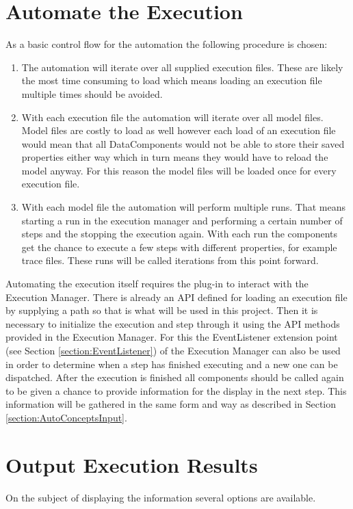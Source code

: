 \section{Automate the Execution}
\label{section:AutoConceptsExecution}
As a basic control flow for the automation the following procedure is chosen:
\begin{enumerate}
 \item The automation will iterate over all supplied execution files. These are likely the most time consuming
to load which means loading an execution file multiple times should be avoided.
 \item With each execution file the automation will iterate over all model files. Model files are costly to load
as well however each load of an execution file would mean that all DataComponents would not be able to store their
saved properties either way which in turn means they would have to reload the model anyway. For this reason the model
files will be loaded once for every execution file.
 \item With each model file the automation will perform multiple runs. That means starting a run in the execution manager
and performing a certain number of steps and the stopping the execution again. With each run the components get the chance
to execute a few steps with different properties, for example trace files. These runs will be called iterations from this
point forward.
\end{enumerate}

Automating the execution itself requires the plug-in to interact with the Execution Manager.
There is already an \ac{API} defined for loading an execution file by supplying a path so that
is what will be used in this project.
Then it is necessary to initialize the execution and step through it using the \ac{API}
methods provided in the Execution Manager. For this the EventListener extension point (see Section \ref{section:EventListener}) of the 
Execution Manager can also be used in order to determine when a step has finished executing and
a new one can be dispatched.
After the execution is finished all components should be called again to be given
a chance to provide information for the display in the next step. This information
will be gathered in the same form and way as described in Section \ref{section:AutoConceptsInput}.

\section{Output Execution Results}
\label{section:AutoConceptsOutput}
On the subject of displaying the information several options are available.

